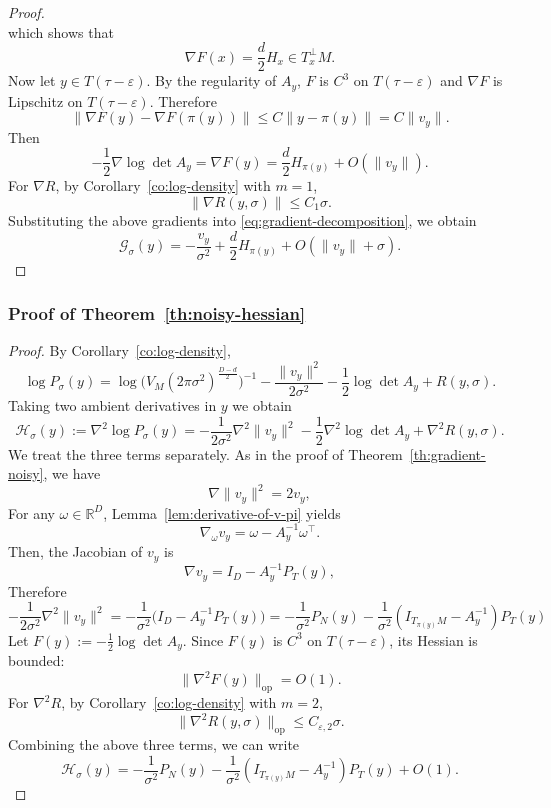 \documentclass[11pt]{article}
\theoremstyle{plain}
\theoremstyle{definition}
\begin{document}
\begin{proof}
\[\]
which shows that
\[
\nabla F(x) = \frac{d}{2} H_x \in T_x^\perp M.
\]
Now let $y \in T(\tau-\varepsilon)$. By the regularity of $A_y$, $F$ is $C^3$ on $T(\tau-\varepsilon)$ and $\nabla F$ is Lipschitz on $T(\tau-\varepsilon)$. Therefore
\[
\|\nabla F(y) - \nabla F(\pi(y))\| \le C\|y-\pi(y)\| =  C \|v_y\|.
\]
Then
\[
-\frac{1}{2}\nabla \log\det A_y
= \nabla F(y)
= \frac{d}{2} H_{\pi(y)} + O(\|v_y\|).
\]
For $\nabla R$, by Corollary~\ref{co:log-density} with $m=1$,
\[
\|\nabla R(y,\sigma)\|
\le C_{1}\sigma.
\]
Substituting the above gradients into \eqref{eq:gradient-decomposition}, we obtain
\[
\mathcal G_\sigma(y)
= - \frac{v_y}{\sigma^2}
  + \frac{d}{2}H_{\pi(y)}
  + O(\|v_y\| + \sigma).
\]
\end{proof}

\subsubsection{Proof of Theorem~\ref{th:noisy-hessian}}\label{sec:pf-noisy hessian}
\begin{proof}
By Corollary~\ref{co:log-density},
\[
\log P_\sigma(y)
= \log \big(V_M(2\pi\sigma^2)^{\frac{D-d}{2}}\big)^{-1} - \frac{\|v_y\|^2}{2\sigma^2}
  - \frac{1}{2}\log\det A_y + R(y,\sigma).
\]
Taking two ambient derivatives in $y$ we obtain
\[
\mathcal{H}_\sigma(y)
:= \nabla^2 \log P_\sigma(y)
= - \frac{1}{2\sigma^2} \nabla^2 \|v_y\|^2
  - \frac{1}{2}\nabla^2 \log\det A_y
  + \nabla^2 R(y,\sigma).
\]
We treat the three terms separately.
As in the proof of Theorem~\ref{th:gradient-noisy}, we have
\[
\nabla \|v_y\|^2 = 2 v_y,
\]
For any $\omega \in \mathbb{R}^D$, Lemma~\ref{lem:derivative-of-v-pi} yields
\[
\nabla_\omega v_y = \omega - A_y^{-1}\omega^\top.
\]
Then, the Jacobian of $v_y$ is
\[
\nabla v_y = I_D - A_y^{-1} P_T(y),
\]
Therefore
\[
- \frac{1}{2\sigma^2}\nabla^2 \|v_y\|^2 = -\frac{1}{\sigma^2} \big( I_D- A_y^{-1}P_T(y) \big) = -\frac{1}{\sigma^2}P_N(y) - \frac{1}{\sigma^2}(I_{T_{\pi(y)}M}-A_y^{-1})P_T(y)
\]
Let $F(y) := -\frac{1}{2}\log\det A_y$. Since $F(y)$ is $C^3$ on $T(\tau-\varepsilon)$, its Hessian is bounded:
\[
\|\nabla^2 F(y)\|_{\mathrm{op}}=O(1).
\]
For $\nabla^2 R$, by Corollary~\ref{co:log-density} with $m=2$,
\[
\|\nabla^2 R(y,\sigma)\|_{\mathrm{op}}
\le C_{\varepsilon,2} \sigma.
\]
Combining the above three terms, we can write
\[
\mathcal{H}_\sigma(y)
= - \frac{1}{\sigma^2}P_N(y)
  - \frac{1}{\sigma^2}(I_{T_{\pi(y)}M} - A_y^{-1})P_T(y)
  + O(1).
\]
\end{proof}
\end{document}
